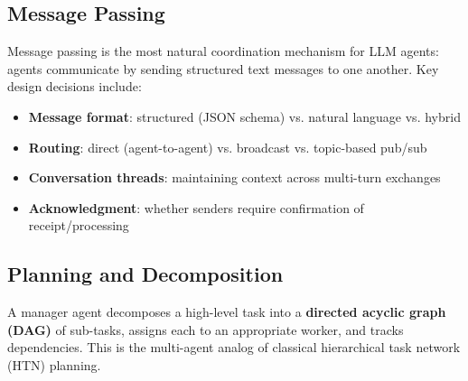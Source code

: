 \subsection{Message Passing}
\label{subsubsec:message-passing}

Message passing is the most natural coordination mechanism for LLM agents: agents communicate by sending structured text messages to one another. Key design decisions include:

\begin{itemize}
  \item \textbf{Message format}: structured (JSON schema) vs. natural language vs. hybrid
  \item \textbf{Routing}: direct (agent-to-agent) vs. broadcast vs. topic-based pub/sub
  \item \textbf{Conversation threads}: maintaining context across multi-turn exchanges
  \item \textbf{Acknowledgment}: whether senders require confirmation of receipt/processing
\end{itemize}

\subsection{Planning and Decomposition}
\label{subsubsec:planning-decomp}

A manager agent decomposes a high-level task into a \textbf{directed acyclic graph (DAG)} of sub-tasks, assigns each to an appropriate worker, and tracks dependencies. This is the multi-agent analog of classical hierarchical task network (HTN) planning.

